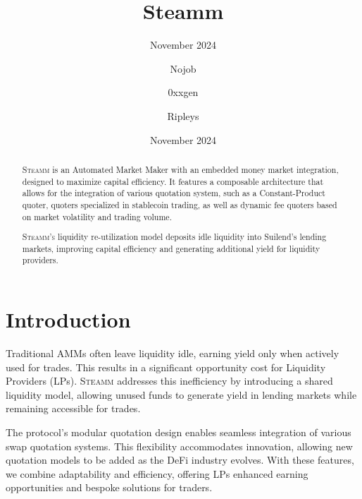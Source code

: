 \documentclass[sigconf,nonacm,prologue,table]{acmart}
\numberwithin{equation}{section}
\theoremstyle{definition}
\theoremstyle{remark}
\begin{document}
\title{Steamm}
\subtitle{November 2024}
\date{November 2024}

\author{Nojob}
\affiliation{}

\author{0xxgen}
\affiliation{}

\author{Ripleys}
\affiliation{}

\begin{teaserfigure}
\caption*{
    \hspace{\textwidth}
    }
\end{teaserfigure}

\renewcommand{\shortauthors}{Adams et al.}

\begin{abstract}

\textsc{Steamm} is an Automated Market Maker with an embedded money market integration, designed to maximize capital efficiency. It features a composable architecture that allows for the integration of various quotation system, such as a Constant-Product quoter, quoters specialized in stablecoin trading, as well as dynamic fee quoters based on market volatility and trading volume.

\textsc{Steamm's} liquidity re-utilization model deposits idle liquidity into Suilend's lending markets, improving capital efficiency and generating additional yield for liquidity providers.
\end{abstract}

\maketitle

\section{Introduction} \label{sec:introduction}

Traditional AMMs often leave liquidity idle, earning yield only when actively used for trades. This results in a significant opportunity cost for Liquidity Providers (LPs). \textsc{Steamm} addresses this inefficiency by introducing a shared liquidity model, allowing unused funds to generate yield in lending markets while remaining accessible for trades.

The protocol’s modular quotation design enables seamless integration of various swap quotation systems. This flexibility accommodates innovation, allowing new quotation models to be added as the DeFi industry evolves. With these features, we combine adaptability and efficiency, offering LPs enhanced earning opportunities and bespoke solutions for traders.
\end{document}
